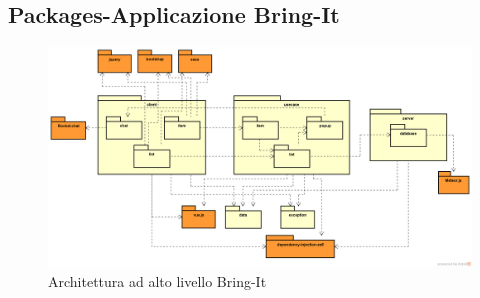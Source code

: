 \subsection{Packages-Applicazione Bring-It}
\label{Architettura ad alto livello-BringIt}
\begin{figure}[H]
	\centering
	\includegraphics[scale=0.4]{Sezioni/Packages/App/pck_application.png}
	\caption{Architettura ad alto livello Bring-It}
\end{figure}

